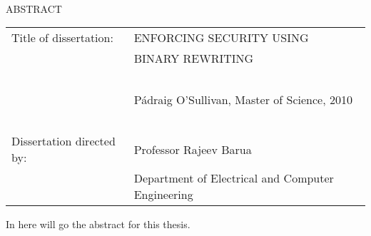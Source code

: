 
\hbox{\ }

\renewcommand{\baselinestretch}{1}
\small \normalsize

\begin{center}
\large{{ABSTRACT}} 

\vspace{3em} 

\end{center}
\hspace{-.15in}
\begin{tabular}{ll}
Title of dissertation:    & {\large  ENFORCING SECURITY USING}\\
&				      {\large  BINARY REWRITING} \\
\ \\
&                          {\large  P\'{a}draig O'Sullivan, Master of Science, 2010} \\
\ \\
Dissertation directed by: & {\large  Professor Rajeev Barua} \\
&  				{\large	 Department of Electrical and Computer Engineering} \\
\end{tabular}

\vspace{3em}

\renewcommand{\baselinestretch}{2}
\large \normalsize

In here will go the abstract for this thesis.
